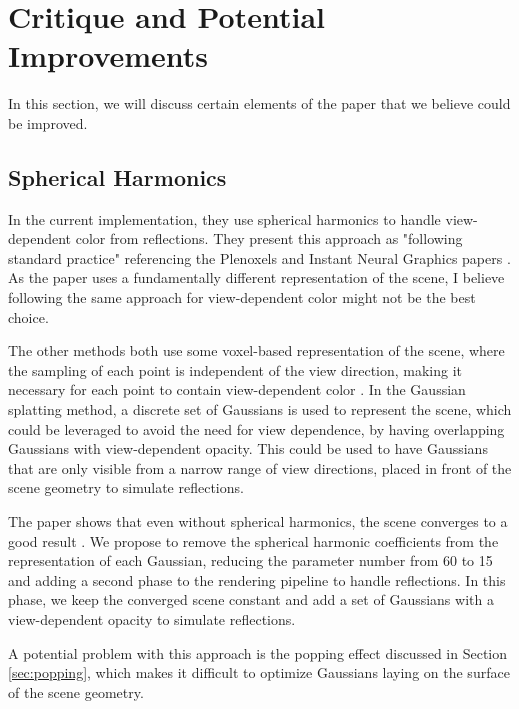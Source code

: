 \section{Critique and Potential Improvements}
In this section, we will discuss certain elements of the paper that we believe could be improved.

\subsection{Spherical Harmonics}
In the current implementation, they use spherical harmonics to handle view-dependent color from reflections.
They present this approach as "following standard practice" referencing the Plenoxels and Instant Neural Graphics papers \cite{yuPlenoxelsRadianceFields2021a}\cite{mullerInstantNeuralGraphics2022}.
As the paper uses a fundamentally different representation of the scene, I believe following the same approach for view-dependent color might not be the best choice.

The other methods both use some voxel-based representation of the scene,
where the sampling of each point is independent of the view direction,
making it necessary for each point to contain view-dependent color \cite{yuPlenoxelsRadianceFields2021a}\cite{mullerInstantNeuralGraphics2022}.
In the Gaussian splatting method, a discrete set of Gaussians is used to represent the scene, which could be leveraged to avoid the need for view dependence, by having overlapping Gaussians with view-dependent opacity.
This could be used to have Gaussians that are only visible from a narrow range of view directions, placed in front of the scene geometry to simulate reflections.

The paper shows that even without spherical harmonics, the scene converges to a good result \cite[Table 3]{kerbl3DGaussianSplatting2023}.
We propose to remove the spherical harmonic coefficients from the representation of each Gaussian, reducing the parameter number from 60 to 15 and adding a second phase to the rendering pipeline to handle reflections.
In this phase, we keep the converged scene constant and add a set of Gaussians with a view-dependent opacity to simulate reflections.

A potential problem with this approach is the popping effect discussed in Section \ref{sec:popping}, which makes it difficult to optimize Gaussians laying on the surface of the scene geometry.


